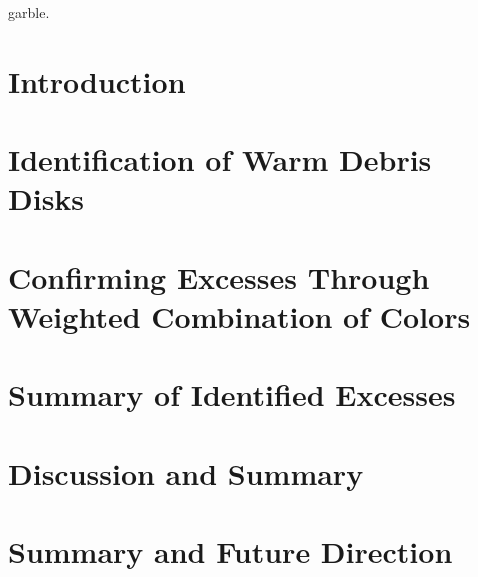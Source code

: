 \documentclass[phd,bottom,nosig]{usbthesis}
\begin{document}
\begin{dedication}
   garble.
\end{dedication}

\tableofcontents %
\listoffigures %
\listoftables %

\begin{acknowledgements}
%   
\end{acknowledgements}

\pagestyle{thesis}



\newpage
{}

\chapter{Introduction} \label{chap:intro}


\chapter{Identification of Warm Debris Disks} \label{chap:iddisks}

\clearpage
%


\chapter{Confirming Excesses Through Weighted Combination of Colors}\label{chap:confirm}

\chapter{Summary of Identified Excesses} \label{chap:summary}

\chapter{Discussion and Summary} \label{chap:disc_and_summary}

\chapter{Summary and Future Direction} \label{chap:future}




%


%
\end{document}
